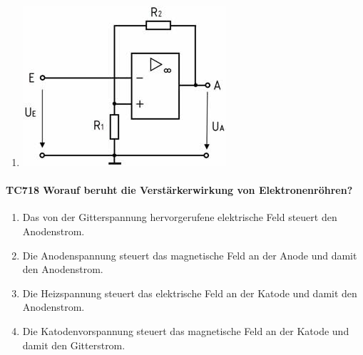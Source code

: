 \documentclass[8pt]{article}
\begin{document}
\begin{enumerate}
\begin{enumerate}[nolistsep,label=\Alph*]
{\begin{enumerate}[nolistsep,label=\Alph*]
\begin{enumerate}[nolistsep,label=\Alph*]
\begin{center}
\begin{minipage}{\linewidth}
	\end{minipage}
\end{center}
\item
\begin{center}
	\begin{minipage}{\linewidth}
		\centering
		\includegraphics[scale=1.0]{pics/tc717_d.jpg}
	\end{minipage}
\end{center}
\end{enumerate}

\paragraph*{TC718 Worauf beruht die Verstärkerwirkung von Elektronenröhren?}
\begin{enumerate}[nolistsep,label=\Alph*]
\item Das von der Gitterspannung hervorgerufene elektrische Feld steuert den Anodenstrom.
\item Die Anodenspannung steuert das magnetische Feld an der Anode und damit den Anodenstrom.
\item Die Heizspannung steuert das elektrische Feld an der Katode und damit den Anodenstrom.
\item Die Katodenvorspannung steuert das magnetische Feld an der Katode und damit den Gitterstrom.
\end{enumerate}


\end{enumerate}}
\end{enumerate}
\end{enumerate}
\end{document}
